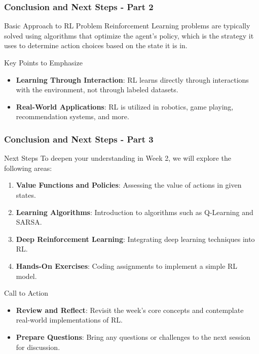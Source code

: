 \documentclass[aspectratio=169]{beamer}
\begin{document}
\begin{frame}[fragile]
    \frametitle{Conclusion and Next Steps - Part 2}
    \begin{block}{Basic Approach to RL Problem}
        Reinforcement Learning problems are typically solved using algorithms that optimize the agent's policy, which is the strategy it uses to determine action choices based on the state it is in.
    \end{block}
    
    \begin{block}{Key Points to Emphasize}
        \begin{itemize}
            \item \textbf{Learning Through Interaction}: RL learns directly through interactions with the environment, not through labeled datasets.
            \item \textbf{Real-World Applications}: RL is utilized in robotics, game playing, recommendation systems, and more.
        \end{itemize}
    \end{block}
\end{frame}

\begin{frame}[fragile]
    \frametitle{Conclusion and Next Steps - Part 3}
    \begin{block}{Next Steps}
        To deepen your understanding in Week 2, we will explore the following areas:
    \end{block}

    \begin{enumerate}
        \item \textbf{Value Functions and Policies}: Assessing the value of actions in given states.
        \item \textbf{Learning Algorithms}: Introduction to algorithms such as Q-Learning and SARSA.
        \item \textbf{Deep Reinforcement Learning}: Integrating deep learning techniques into RL.
        \item \textbf{Hands-On Exercises}: Coding assignments to implement a simple RL model.
    \end{enumerate}
    
    \begin{block}{Call to Action}
        \begin{itemize}
            \item \textbf{Review and Reflect}: Revisit the week's core concepts and contemplate real-world implementations of RL.
            \item \textbf{Prepare Questions}: Bring any questions or challenges to the next session for discussion.
        \end{itemize}
    \end{block}
\end{frame}
\end{document}
